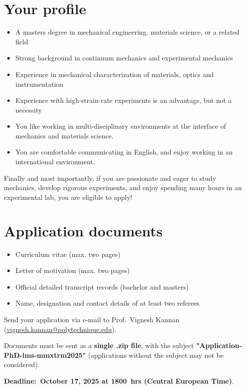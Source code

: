 \documentclass[a4paper,11pt,fleqn]{article}
\begin{document}
	\section*{Your profile}
	\begin{itemize}[leftmargin=*]
		\itemsep-0.10em
		\item A masters degree in mechanical engineering, materials science, or a related field
		\item Strong background in continuum mechanics and experimental mechanics
		\item Experience in mechanical characterization of materials, optics and instrumentation
		\item Experience with high-strain-rate experiments is an advantage, but not a necessity
		\item You like working in multi-disciplinary environments at the interface of mechanics and materials science.
		\item You are comfortable communicating in English, and enjoy working in an international environment.
	\end{itemize}
	\vspace{-1em}
	Finally and most importantly, if you are passionate and eager to study mechanics, develop rigorous experiments, and enjoy spending many hours in an experimental lab, you are eligible to apply!

	\section*{Application documents}
	\begin{itemize}[leftmargin=*]
		\itemsep-0.10em
		\item Curriculum vitae (max. two pages)
		\item Letter of motivation (max. two pages)
		\item  Official detailed transcript records (bachelor and masters)
		\item Name, designation and contact details of at least two referees
	\end{itemize}

	\begin{center}
		\vspace*{0em}
		{Send your application} via e-mail to {Prof.~Vignesh Kannan} (\href{mailto:vignesh.kannan@polytechnique.edu}{vignesh.kannan@polytechnique.edu}).
		
		Documents must be sent as a \textbf{single .zip file}, with the subject \textbf{"Application-PhD-lms-mmxtrm2025"} (applications without the subject may not be considered). 
		
		\textbf{Deadline:~October 17, 2025 at 1800~hrs (Central European Time)}. 
	\end{center}
\end{document}
